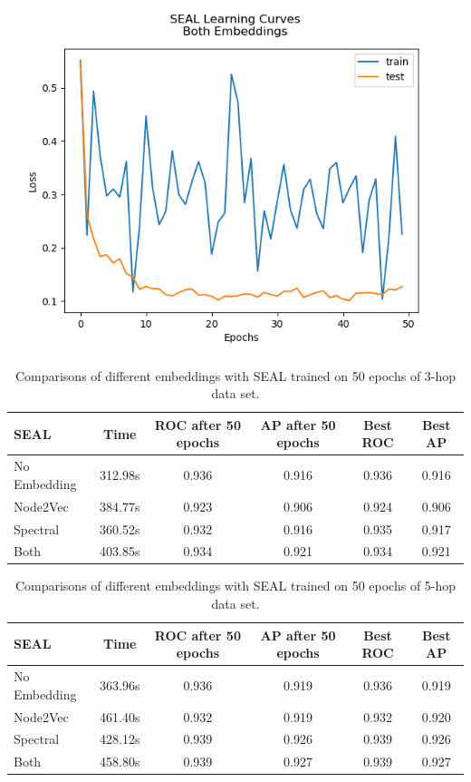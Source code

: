 \documentclass[10pt,twocolumn,letterpaper]{article}
\begin{document}
\begin{center}
\includegraphics[scale=0.35]{latex/images/Both Embeddings.png}
\end{center}



\begin{table}
\begin{center}
\begin{tabular}{|l|c|c|c|c|c|}
\hline
SEAL & Time & ROC after 50 epochs  & AP after 50 epochs & Best ROC & Best AP \\
\hline\hline
No Embedding & 312.98s & 0.936 & 0.916 & 0.936 & 0.916\\
Node2Vec & 384.77s & 0.923 & 0.906 & 0.924 & 0.906\\
Spectral  & 360.52s & 0.932 & 0.916 & 0.935 & 0.917\\
Both  & 403.85s & 0.934 & 0.921 & 0.934 & 0.921\\
\hline
\end{tabular}
\end{center}
\caption{Comparisons of different embeddings with SEAL trained on 50 epochs of 3-hop data set.}
\label{tab:contributions}
\end{table}

\begin{table}
\begin{center}
\begin{tabular}{|l|c|c|c|c|c|}
\hline
SEAL & Time & ROC after 50 epochs  & AP after 50 epochs & Best ROC & Best AP \\
\hline\hline
No Embedding & 363.96s & 0.936 & 0.919 & 0.936 & 0.919\\
Node2Vec & 461.40s & 0.932 & 0.919 & 0.932 & 0.920\\
Spectral & 428.12s & 0.939 & 0.926 & 0.939 & 0.926\\
Both  & 458.80s & 0.939 & 0.927 & 0.939 & 0.927\\
\hline
\end{tabular}
\end{center}
\caption{Comparisons of different embeddings with SEAL trained on 50 epochs of 5-hop data set.}
\label{tab:contributions}
\end{table}
\end{document}
